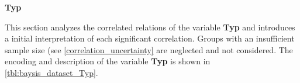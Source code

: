 \Large
\centerline{\textbf{Typ}}
\normalsize
This section analyzes the correlated relations of the variable \textbf{Typ} and introduces a initial interpretation of each significant correlation. Groups with an insufficient sample size (see \autoref{correlation_uncertainty} are neglected and not considered. The encoding and description of the variable \textbf{Typ} is shown in \autoref{tbl:baysis_dataset_Typ}.

